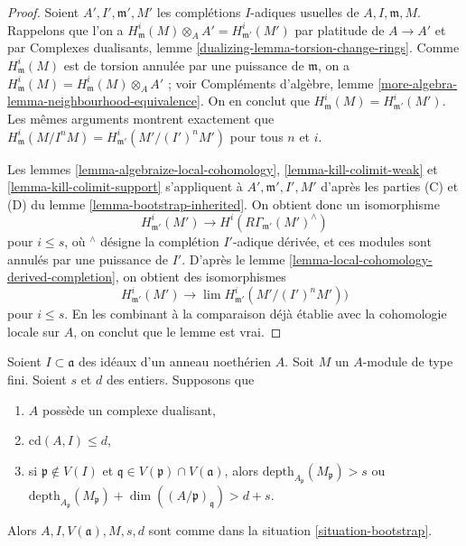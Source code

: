 \begin{proof}
Soient $A', I', \mathfrak m', M'$ les complétions $I$-adiques usuelles
de $A, I, \mathfrak m, M$. Rappelons que l'on a
$H^i_\mathfrak m(M) \otimes_A A' = H^i_{\mathfrak m'}(M')$
par platitude de $A \to A'$ et par Complexes dualisants, lemme
\ref{dualizing-lemma-torsion-change-rings}.
Comme $H^i_\mathfrak m(M)$ est de torsion annulée par une puissance de $\mathfrak m$, on a
$H^i_\mathfrak m(M) = H^i_\mathfrak m(M) \otimes_A A'$ ; voir
Compléments d'algèbre, lemme \ref{more-algebra-lemma-neighbourhood-equivalence}.
On en conclut que $H^i_\mathfrak m(M) = H^i_{\mathfrak m'}(M')$.
Les mêmes arguments montrent exactement que
$H^i_\mathfrak m(M/I^nM) =  H^i_{\mathfrak m'}(M'/(I')^nM')$
pour tous $n$ et $i$.

\medskip\noindent
Les lemmes \ref{lemma-algebraize-local-cohomology},
\ref{lemma-kill-colimit-weak} et
\ref{lemma-kill-colimit-support}
s'appliquent à $A', \mathfrak m', I', M'$ d'après les parties (C) et (D) du
lemme \ref{lemma-bootstrap-inherited}.
On obtient donc un isomorphisme
$$
H^i_{\mathfrak m'}(M') \longrightarrow H^i(R\Gamma_{\mathfrak m'}(M')^\wedge)
$$
pour $i \leq s$, où ${}^\wedge$ désigne la complétion $I'$-adique dérivée, et ces
modules sont annulés par une puissance de $I'$.
D'après le lemme \ref{lemma-local-cohomology-derived-completion},
on obtient des isomorphismes
$$
H^i_{\mathfrak m'}(M') \longrightarrow
\lim H^i_{\mathfrak m'}(M'/(I')^nM'))
$$
pour $i \leq s$. En les combinant à la comparaison déjà établie
avec la cohomologie locale sur $A$, on conclut que le lemme est vrai.
\end{proof}

\begin{lemma}
\label{lemma-bootstrap-bis-bis}
Soient $I \subset \mathfrak a$ des idéaux d'un anneau noethérien $A$.
Soit $M$ un $A$-module de type fini. Soient $s$ et $d$ des entiers.
Supposons que
\begin{enumerate}
\item[(a)] $A$ possède un complexe dualisant,
\item[(b)] $\text{cd}(A, I) \leq d$,
\item[(c)] si $\mathfrak p \not \in V(I)$ et
$\mathfrak q \in V(\mathfrak p) \cap V(\mathfrak a)$, alors
$\text{depth}_{A_\mathfrak p}(M_\mathfrak p) > s$ ou
$\text{depth}_{A_\mathfrak p}(M_\mathfrak p) +
\dim((A/\mathfrak p)_\mathfrak q) > d + s$.
\end{enumerate}
Alors $A, I, V(\mathfrak a), M, s, d$ sont comme dans la
situation \ref{situation-bootstrap}.
\end{lemma}

